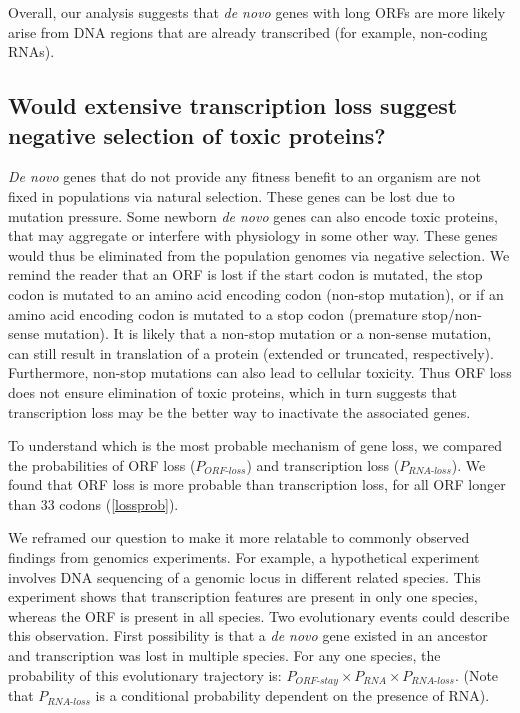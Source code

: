 \documentclass[12pt,a4paper]{article}
\begin{document}
Overall, our analysis suggests that \textit{de novo} genes with long ORFs are more likely arise from DNA regions that are already transcribed (for example, non-coding RNAs). 

\subsection{Would extensive transcription loss suggest negative selection of toxic proteins?}


\textit{De novo} genes that do not provide any fitness benefit to an organism are not fixed in populations via natural selection. These genes can be lost due to mutation pressure. Some newborn \textit{de novo} genes can also encode toxic proteins, that may aggregate or interfere with physiology in some other way. These genes would thus be eliminated from the population genomes via negative selection. We remind the reader that an ORF is lost if the start codon is mutated, the stop codon is mutated to an amino acid encoding codon (non-stop mutation), or if an amino acid encoding codon is mutated to a stop codon (premature stop/non-sense mutation). It is likely that a non-stop mutation or a non-sense mutation, can still result in translation of a protein (extended or truncated, respectively). Furthermore, non-stop mutations can also lead to cellular toxicity. Thus ORF loss does not ensure elimination of toxic proteins, which in turn suggests that transcription loss may be the better way to inactivate the associated genes.

To understand which is the most probable mechanism of gene loss, we compared the probabilities of ORF loss ($P_\textit{ORF-loss}$) and transcription loss ($P_\textit{RNA-loss}$). We found that ORF loss is more probable than transcription loss, for all ORF longer than 33 codons (\autoref{lossprob}).

We reframed our question to make it more relatable to commonly observed findings from genomics experiments. For example, a hypothetical experiment involves DNA sequencing of a genomic locus in different related species. This experiment shows that transcription features are present in only one species, whereas the ORF is present in all species. Two evolutionary events could describe this observation. First possibility is that a \textit{de novo} gene existed in an ancestor and transcription was lost in multiple species. For any one species, the probability of this evolutionary trajectory is: $P_\textit{ORF-stay}\times P_\textit{RNA} \times P_\textit{RNA-loss}$. (Note that $P_\textit{RNA-loss}$ is a conditional probability dependent on the presence of RNA).
\end{document}
